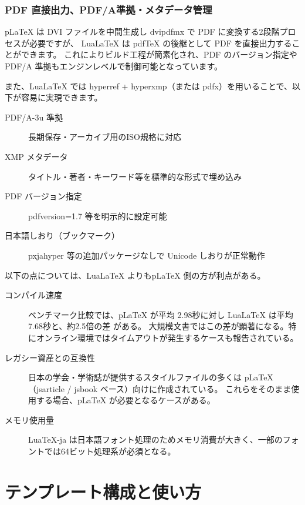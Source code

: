 \documentclass[10pt]{book}
\begin{document}
\vspace{5mm}
\subsection{PDF 直接出力、PDF/A準拠・メタデータ管理}
pLaTeX は DVI ファイルを中間生成し dvipdfmx で PDF に変換する2段階プロセスが必要ですが、
LuaLaTeX は pdfTeX の後継として PDF を直接出力することができます。
これによりビルド工程が簡素化され、PDF のバージョン指定や PDF/A 準拠もエンジンレベルで制御可能となっています。

また、LuaLaTeX では hyperref + hyperxmp（または pdfx）を用いることで、以下が容易に実現できます。
\begin{description}
	\item [PDF/A-3u 準拠] 長期保存・アーカイブ用のISO規格に対応
	\item [XMP メタデータ] タイトル・著者・キーワード等を標準的な形式で埋め込み
	\item [PDF バージョン指定] pdfversion=1.7 等を明示的に設定可能
	\item [日本語しおり（ブックマーク）] pxjahyper 等の追加パッケージなしで Unicode しおりが正常動作
\end{description}

\vspace{15mm}
\begin{columnbox}
以下の点については、LuaLaTeX よりもpLaTeX 側の方が利点がある。
	\begin{description}
	\item [コンパイル速度] 
	ベンチマーク比較では、pLaTeX が平均 2.98秒に対し LuaLaTeX は平均 7.68秒と、約2.5倍の差 がある。
	大規模文書ではこの差が顕著になる。特にオンライン環境ではタイムアウトが発生するケースも報告されている。

	\item[レガシー資産との互換性] 日本の学会・学術誌が提供するスタイルファイルの多くは pLaTeX（jsarticle / jsbook ベース）向けに作成されている。
	これらをそのまま使用する場合、pLaTeX が必要となるケースがある。

	\item[メモリ使用量]LuaTeX-ja は日本語フォント処理のためメモリ消費が大きく、一部のフォントでは64ビット処理系が必須となる。
	\end{description}
\end{columnbox}

\chapter{テンプレート構成と使い方}
\newpage
\end{document}

